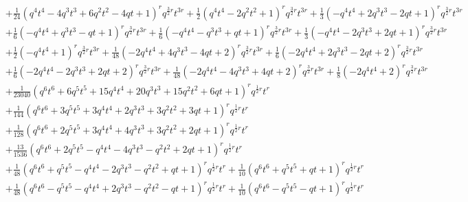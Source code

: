 \documentclass[11pt,english]{amsart}
\numberwithin{equation}{section}
\numberwithin{figure}{section}
\theoremstyle{plain}
\theoremstyle{plain}
\theoremstyle{definition}
\theoremstyle{remark}
\begin{document}
{\begin{align*}
& + \frac{1}{24} {\left(q^{4} t^{4} - 4 q^{3} t^{3} + 6 q^{2} t^{2} - 4 q t + 1\right)}^{r} q^{\frac{3}{2} r}t^{3r} + \frac{1}{2} {\left(q^{4} t^{4} - 2 q^{2} t^{2} + 1\right)}^{r} q^{\frac{3}{2} r}t^{3r} + \frac{1}{3} {\left(-q^{4} t^{4} + 2 q^{3} t^{3} - 2 q t + 1\right)}^{r} q^{\frac{3}{2} r}t^{3r} \\
& + \frac{1}{6} {\left(-q^{4} t^{4} + q^{3} t^{3} - q t + 1\right)}^{r} q^{\frac{3}{2} r}t^{3r} + \frac{1}{6} {\left(-q^{4} t^{4} - q^{3} t^{3} + q t + 1\right)}^{r} q^{\frac{3}{2} r}t^{3r} + \frac{1}{3} {\left(-q^{4} t^{4} - 2 q^{3} t^{3} + 2 q t + 1\right)}^{r} q^{\frac{3}{2} r}t^{3r} \\
& + \frac{1}{2} {\left(-q^{4} t^{4} + 1\right)}^{r} q^{\frac{3}{2} r}t^{3r} + \frac{1}{48} {\left(-2 q^{4} t^{4} + 4 q^{3} t^{3} - 4 q t + 2\right)}^{r} q^{\frac{3}{2} r}t^{3r} + \frac{1}{6} {\left(-2 q^{4} t^{4} + 2 q^{3} t^{3} - 2 q t + 2\right)}^{r} q^{\frac{3}{2} r}t^{3r} \\
& + \frac{1}{6} {\left(-2 q^{4} t^{4} - 2 q^{3} t^{3} + 2 q t + 2\right)}^{r} q^{\frac{3}{2} r}t^{3r} + \frac{1}{48} {\left(-2 q^{4} t^{4} - 4 q^{3} t^{3} + 4 q t + 2\right)}^{r} q^{\frac{3}{2} r}t^{3r} + \frac{1}{8} {\left(-2 q^{4} t^{4} + 2\right)}^{r} q^{\frac{3}{2} r}t^{3r} \\
& + \frac{1}{23040} {\left(q^{6} t^{6} + 6 q^{5} t^{5} + 15 q^{4} t^{4} + 20 q^{3} t^{3} + 15 q^{2} t^{2} + 6 q t + 1\right)}^{r} q^{\frac{1}{2} r}t^{r} \\
& + \frac{1}{144} {\left(q^{6} t^{6} + 3 q^{5} t^{5} + 3 q^{4} t^{4} + 2 q^{3} t^{3} + 3 q^{2} t^{2} + 3 q t + 1\right)}^{r} q^{\frac{1}{2} r}t^{r} \\
& + \frac{1}{128} {\left(q^{6} t^{6} + 2 q^{5} t^{5} + 3 q^{4} t^{4} + 4 q^{3} t^{3} + 3 q^{2} t^{2} + 2 q t + 1\right)}^{r} q^{\frac{1}{2} r}t^{r} \\
& + \frac{13}{1536} {\left(q^{6} t^{6} + 2 q^{5} t^{5} - q^{4} t^{4} - 4 q^{3} t^{3} - q^{2} t^{2} + 2 q t + 1\right)}^{r} q^{\frac{1}{2} r}t^{r} \\
& + \frac{1}{48} {\left(q^{6} t^{6} + q^{5} t^{5} - q^{4} t^{4} - 2 q^{3} t^{3} - q^{2} t^{2} + q t + 1\right)}^{r} q^{\frac{1}{2} r}t^{r} + \frac{1}{10} {\left(q^{6} t^{6} + q^{5} t^{5} + q t + 1\right)}^{r} q^{\frac{1}{2} r}t^{r} \\
& + \frac{1}{48} {\left(q^{6} t^{6} - q^{5} t^{5} - q^{4} t^{4} + 2 q^{3} t^{3} - q^{2} t^{2} - q t + 1\right)}^{r} q^{\frac{1}{2} r}t^{r} + \frac{1}{10} {\left(q^{6} t^{6} - q^{5} t^{5} - q t + 1\right)}^{r} q^{\frac{1}{2} r}t^{r} \\

\end{align*}}
\end{document}
